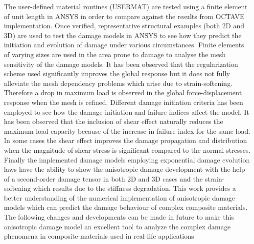 \documentclass[12pt,twoside]{report}
\begin{document}
\indent\indent\indent The user-defined material routines (USERMAT) are tested using a finite element of unit length in ANSYS in order to compare against the results from OCTAVE implementation. Once verified, representative structural examples (both 2D and 3D) are used to test the damage models in ANSYS to see how they predict the initiation and evolution of damage under various circumstances. Finite elements of varying sizes are used in the area prone to damage to analyse the mesh sensitivity of the damage models. It has been observed that the regularization scheme used significantly improves the global response but it does not fully alleviate the mesh dependency problems which arise due to strain-softening. Therefore a drop in maximum load is observed in the global force-displacement response when the mesh is refined. Different damage initiation criteria has been employed to see how the damage initiation and failure indices affect the model. It has been observed that the inclusion of shear effect naturally reduces the maximum load capacity because of the increase in failure index for the same load. In some cases the shear effect improves the damage propagation and distribution when the magnitude of shear stress is significant compared to the normal stresses. Finally the implemented damage models employing exponential damage evolution laws have the ability to show the anisotropic damage development with the help of a second-order damage tensor in both 2D and 3D cases and the strain-softening which results due to the stiffness degradation. This work provides a better understanding of the numerical implementation of anisotropic damage models which can predict the damage behaviour of complex composite materials.\\

The following changes and developments can be made in future to make this anisotropic damage model an excellent tool to analyze the complex damage phenomena in composite-materials used in real-life applications
\end{document}
